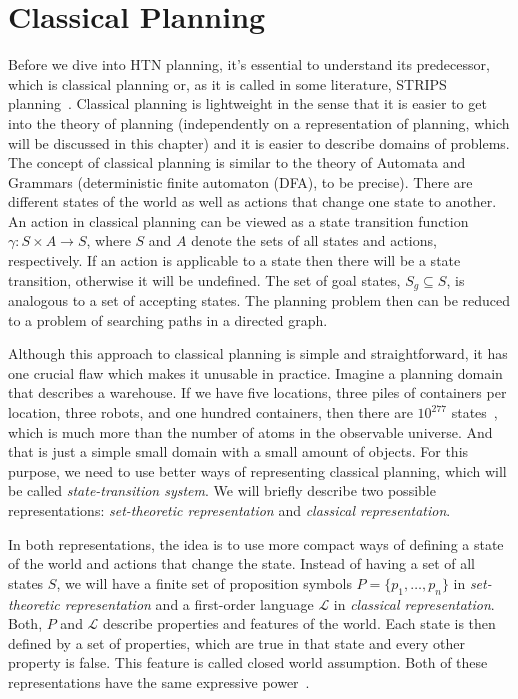 \chapter{Classical {P}lanning}

\medskip\noindent
Before we dive into HTN planning, it's essential to understand its predecessor, which is classical planning or, as it is called in some literature, STRIPS planning~\cite{strips}. Classical planning is lightweight in the sense that it is easier to get into the theory of planning (independently on a representation of planning, which will be discussed in this chapter) and it is easier to describe domains of problems. The concept of classical planning is similar to the theory of Automata and Grammars (deterministic finite automaton (DFA), to be precise). There are different states of the world as well as actions that change one state to another. An action in classical planning can be viewed as a state transition function $\gamma: S \times A \rightarrow S$, where $S$ and $A$ denote the sets of all states and actions, respectively. If an action is applicable to a state then there will be a state transition, otherwise it will be undefined. The set of goal states, $S_g \subseteq S$, is analogous to a set of accepting states. The planning problem then can be reduced to a problem of searching paths in a directed graph.

\medskip\noindent
Although this approach to classical planning is simple and straightforward, it has one crucial flaw which makes it unusable in practice. Imagine a planning domain that describes a warehouse. If we have five locations, three piles of containers per location, three robots, and one hundred containers, then there are $10^{277}$ states~\cite{nau}, which is much more than the number of atoms in the observable universe. And that is just a simple small domain with a small amount of objects. For this purpose, we need to use better ways of representing classical planning, which will be called \emph{state-transition system}. We will briefly describe two possible representations: \emph{set-theoretic representation} and \emph{classical representation}.

\medskip\noindent
In both representations, the idea is to use more compact ways of defining a state of the world and actions that change the state. Instead of having a set of all states $S$, we will have a finite set of proposition symbols $P = \{p_1,\dots,p_n\}$ in \emph{set-theoretic representation} and a first-order language $\mathcal{L}$ in \emph{classical representation}. Both, $P$ and $\mathcal{L}$ describe properties and features of the world. Each state is then defined by a set of properties, which are true in that state and every other property is false. This feature is called closed world assumption. Both of these representations have the same expressive power~\cite{nau}. 

